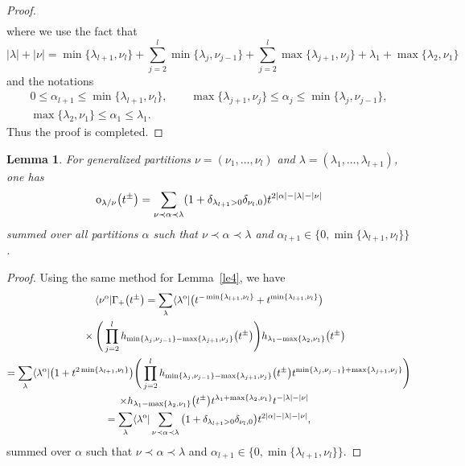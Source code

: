 \documentclass[pdftex]{sigma}
\numberwithin{equation}{section}
\newtheorem{Lemma}[Theorem]{Lemma}
\begin{document}
\begin{proof}
\begin{gather*}
\end{gather*}
 where we use the fact that \[
 |\lambda|+|\nu|=\min\{\lambda_{l+1},\nu_l\}+\sum^l_{j=2}\min\{\lambda_j,\nu_{j-1}\}+\sum^l_{j=2}\max\{\lambda_{j+1},\nu_j\}+\lambda_1+\max\{\lambda_2,\nu_1\}
 \] and the notations
\begin{gather*}
 0\leq \alpha_{l+1}\leq\min\{\lambda_{l+1},\nu_l\}, \qquad \max\{\lambda_{j+1},\nu_j\}\leq \alpha_{j}\leq\min\{\lambda_j,\nu_{j-1}\},\\ \max\{\lambda_2,\nu_1\}\leq\alpha_1\leq \lambda_1.
\end{gather*}
Thus the proof is completed.
\end{proof}

\begin{Lemma}\label{le2}
For generalized partitions $\nu=(\nu_{1},\dots,\nu_{l})$ and $\lambda=(\lambda_{1},\dots,\lambda_{l+1})$, one has
\begin{align*}
{\rm o}_{\lambda/\nu}\big(t^{\pm}\big)=\sum_{\nu\prec\alpha\prec\lambda}(1+\delta_{\lambda_{l+1}>0}\delta_{\nu_{l},0})t^{2|\alpha|-|\lambda|-|\nu|}
\end{align*}
summed over all partitions $\alpha$ such that $\nu\prec\alpha\prec\lambda$ and $\alpha_{l+1}\in \{0,\min\{\lambda_{l+1},\nu_{l}\}\}$.
\end{Lemma}
\begin{proof}
Using the same method for Lemma~\ref{le4}, we have
\begin{gather*}
 \langle\nu^{\rm o}|\Gamma_+\big(t^{\pm}\big) =\sum_{\lambda}\langle\lambda^{\rm o}|\big(t^{-\min\{\lambda_{l+1},\nu_l\}}+t^{\min\{\lambda_{l+1},\nu_l\}}\big)\\
 \quad{}\times\Bigg(\prod^{l}_{j=2}h_{\min\{\lambda_j,\nu_{j-1}\}-\max\{\lambda_{j+1},\nu_j\}}\big(t^{\pm}\big)\Bigg)
 h_{\lambda_1-\max\{\lambda_2,\nu_1\}}\big(t^{\pm}\big)
\\
 = \sum_{\lambda}\langle\lambda^{\rm o}|\big(1+t^{2\min\{\lambda_{l+1},\nu_l\}}\big) \Bigg(\prod^{l}_{j=2}h_{\min\{\lambda_j,\nu_{j-1}\}-\max\{\lambda_{j+1},\nu_j\}}\big(t^{\pm}\big)t^{\min\{\lambda_j,\nu_{j-1}\}+\max\{\lambda_{j+1},\nu_j\}}\Bigg)\\
 \quad\times h_{\lambda_1-\max\{\lambda_2,\nu_1\}}\big(t^{\pm}\big)t^{\lambda_1+\max\{\lambda_2,\nu_1\}} t^{-|\lambda|-|\nu|}\\
= \sum_{\lambda}\langle\lambda^{\rm o}|\sum_{\nu\prec\alpha\prec\lambda}\big(1+\delta_{\lambda_{l+1}>0}\delta_{\nu_{l},0}\big)t^{2|\alpha|-|\lambda|-|\nu|},
\end{gather*}
summed over $\alpha$ such that $\nu\prec\alpha\prec\lambda$ and $\alpha_{l+1}\in \{0,\min\{\lambda_{l+1},\nu_{l}\}\}$.
\end{proof}
\end{document}
